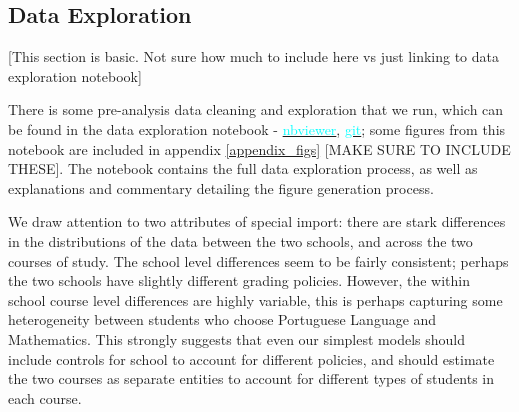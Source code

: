 \documentclass[12pt]{article}
\begin{document}
\subsection{Data Exploration}
\textcolor{BrickRed}{[This section is basic. Not sure how much to include here vs just linking to data exploration notebook]}

There is some pre-analysis data cleaning and exploration that we run, which can be found in the data exploration notebook - \href{https://nbviewer.jupyter.org/github/nadavtadelis/Reproducible_Metrics/blob/master/data_exploration.ipynb}{\textcolor{cyan}{nbviewer}}, \href{https://github.com/nadavtadelis/Reproducible_Metrics/blob/master/data_exploration.ipynb}{\textcolor{cyan}{git}}; some figures from this notebook are included in appendix \ref{appendix_figs} \textcolor{BrickRed}{[MAKE SURE TO INCLUDE THESE]}. The notebook contains the full data exploration process, as well as explanations and commentary detailing the figure generation process.

We draw attention to two attributes of special import: there are stark differences in the distributions of the data between the two schools, and across the two courses of study. The school level differences seem to be fairly consistent; perhaps the two schools have slightly different grading policies. However, the within school course level differences are highly variable, this is perhaps capturing some heterogeneity between students who choose Portuguese Language and Mathematics. This strongly suggests that even our simplest models should include controls for school to account for different policies, and should estimate the two courses as separate entities to account for different types of students in each course.


\end{document}
